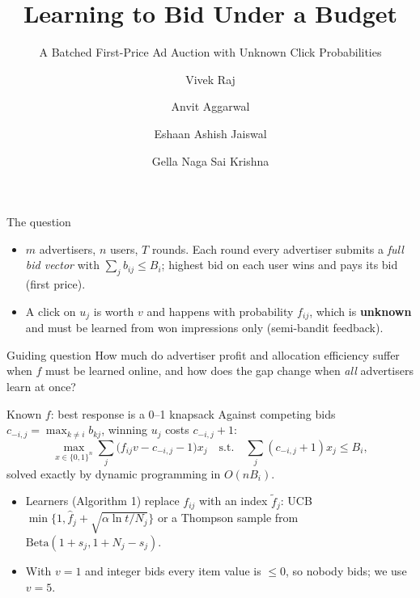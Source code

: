 \documentclass[aspectratio=169,11pt]{beamer}
\title{Learning to Bid Under a Budget}
\subtitle{A Batched First-Price Ad Auction with Unknown Click Probabilities}
\author{Vivek Raj \and Anvit Aggarwal \and Eshaan Ashish Jaiswal \and Gella Naga Sai Krishna}
\institute{IIT Gandhinagar --- CS329 Foundations of AI, Group 22}
\date{}
\begin{document}
\begin{frame}
  \titlepage
\end{frame}

\begin{frame}{The question}
  \begin{itemize}
    \item $m$ advertisers, $n$ users, $T$ rounds. Each round every advertiser submits a \emph{full bid
          vector} with $\sum_j b_{ij}\le B_i$; highest bid on each user wins and pays its bid
          (first price).
    \item A click on $u_j$ is worth $v$ and happens with probability $f_{ij}$, which is
          \textbf{unknown} and must be learned from won impressions only (semi-bandit feedback).
  \end{itemize}
  \vspace{1em}
  \begin{block}{Guiding question}
    How much do advertiser profit and allocation efficiency suffer when $f$ must be learned online,
    and how does the gap change when \emph{all} advertisers learn at once?
  \end{block}
\end{frame}

\begin{frame}{Known $f$: best response is a 0--1 knapsack}
  Against competing bids $c_{-i,j}=\max_{k\ne i}b_{kj}$, winning $u_j$ costs $c_{-i,j}+1$:
  \[
    \max_{x\in\{0,1\}^n}\sum_j\big(f_{ij}v-c_{-i,j}-1\big)x_j
    \quad\text{s.t.}\quad\sum_j(c_{-i,j}+1)x_j\le B_i ,
  \]
  solved exactly by dynamic programming in $O(nB_i)$.
  \vspace{0.8em}
  \begin{itemize}
    \item Learners (Algorithm 1) replace $f_{ij}$ with an index $\tilde f_j$:
          UCB $\min\{1,\hat f_j+\sqrt{\alpha\ln t/N_j}\}$ or a Thompson sample from
          $\mathrm{Beta}(1+s_j,1+N_j-s_j)$.
    \item With $v=1$ and integer bids every item value is $\le 0$, so nobody bids; we use $v=5$.
  \end{itemize}
\end{frame}
\end{document}
